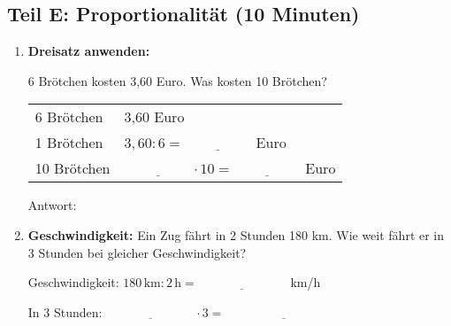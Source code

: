 \subsection*{Teil E: Proportionalität (10 Minuten)}

\begin{enumerate}[label=\arabic*.]
    \item \textbf{Dreisatz anwenden:}
    \vspace{0.5cm}

    6 Brötchen kosten 3{,}60 Euro. Was kosten 10 Brötchen?

    \begin{tabular}{l|l}
        6 Brötchen & 3{,}60 Euro \\
        1 Brötchen & $3{,}60 : 6 = \underline{\hspace{2cm}}$ Euro \\
        10 Brötchen & $\underline{\hspace{2cm}} \cdot 10 = \underline{\hspace{2cm}}$ Euro \\
    \end{tabular}

    Antwort: \underline{\hspace{4cm}}

    \vspace{1cm}

    \item \textbf{Geschwindigkeit:}
    Ein Zug fährt in 2 Stunden 180 km. Wie weit fährt er in 3 Stunden bei gleicher Geschwindigkeit?

    Geschwindigkeit: $180\,\text{km} : 2\,\text{h} = \underline{\hspace{3cm}}$ km/h

    In 3 Stunden: $\underline{\hspace{3cm}} \cdot 3 = \underline{\hspace{4cm}}$
\end{enumerate}